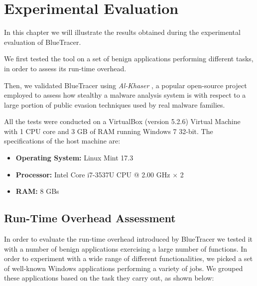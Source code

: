 
\chapter{Experimental Evaluation}

In this chapter we will illustrate the results obtained during the experimental evaluation of BlueTracer.

We first tested the tool on a set of benign applications performing different tasks, in order to assess its run-time overhead.

Then, we validated BlueTracer using \textit{Al-Khaser} \cite{AlK}, a popular open-source project employed to assess how stealthy a malware analysis system is with respect to a large portion of public evasion techniques used by real malware families.

\iffalse
Finally, we employed BlueTracer to analyze a group of highly evasive real malware samples collected by Joe Security, the proclaimed technology leader for the analysis of evasive malware.
\fi

\iffalse
If JoeBox added differentiate machines
\fi
All the tests were conducted on a VirtualBox (version 5.2.6)  Virtual Machine with 1 CPU core and 3 GB of RAM running Windows 7 32-bit. The specifications of the host machine are:
\begin{itemize}
\item \textbf{Operating System:} Linux Mint 17.3 
\item \textbf{Processor:} Intel Core i7-3537U CPU @ 2.00 GHz $\times$ 2
\item \textbf{RAM:} 8 GBs  
\end{itemize}
 

\section{Run-Time Overhead Assessment}

In order to evaluate the run-time overhead introduced by BlueTracer we tested it with a number of benign applications exercising a large number of functions. In order to experiment with a wide range of different functionalities, we picked a set of well-known Windows applications performing a variety of jobs. We grouped these applications based on the task they carry out, as shown below:

